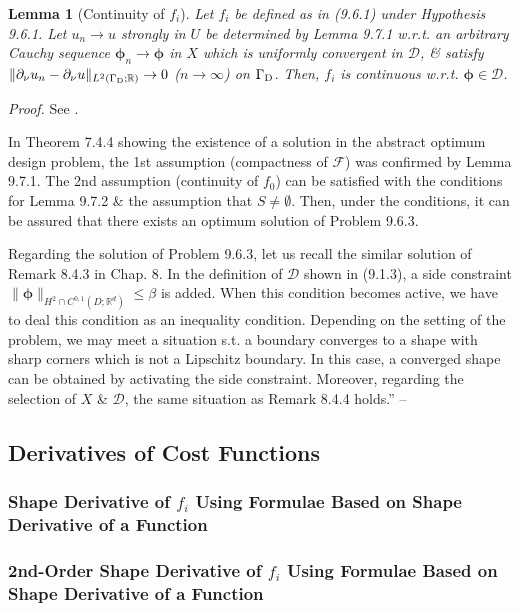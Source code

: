 \documentclass[oneside]{book}
\numberwithin{equation}{section}
\newtheorem{lemma}{Lemma}[chapter]
\begin{document}
\begin{lemma}[Continuity of $f_i$]
	Let $f_i$ be defined as in (9.6.1) under Hypothesis 9.6.1. Let $u_n\to u$ strongly in $U$ be determined by Lemma 9.7.1 w.r.t. an arbitrary Cauchy sequence $\boldsymbol{\phi}_n\to\boldsymbol{\phi}$ in $X$ which is uniformly convergent in $\mathcal{D}$, \& satisfy $\|\partial_\nu u_n - \partial_\nu u\|_{L^2(\Gamma_{\rm D};\mathbb{R})}\to 0$ ($n\to\infty$) on $\Gamma_{\rm D}$. Then, $f_i$ is continuous w.r.t. $\boldsymbol{\phi}\in\mathcal{D}$.
\end{lemma}
\textit{Proof.} See \cite[pp. 474--476]{Azegami2020}.

In Theorem 7.4.4 showing the existence of a solution in the abstract optimum design problem, the 1st assumption (compactness of $\mathcal{F}$) was confirmed by Lemma 9.7.1. The 2nd assumption (continuity of $f_0$) can be satisfied with the conditions for Lemma 9.7.2 \& the assumption that $S\ne\emptyset$. Then, under the conditions, it can be assured that there exists an optimum solution of Problem 9.6.3.

Regarding the solution of Problem 9.6.3, let us recall the similar solution of Remark 8.4.3 in Chap. 8. In the definition of $\mathcal{D}$ shown in (9.1.3), a side constraint $\|\boldsymbol{\phi}\|_{H^2\cap C^{0,1}(D;\mathbb{R}^d)}\le\beta$ is added. When this condition becomes active, we have to deal this condition as an inequality condition. Depending on the setting of the problem, we may meet a situation s.t. a boundary converges to a shape with sharp corners which is not a Lipschitz boundary. In this case, a converged shape can be obtained by activating the side constraint. Moreover, regarding the selection of $X$ \& $\mathcal{D}$, the same situation as Remark 8.4.4 holds.'' -- \cite[pp. 470--477]{Azegami2020}

\subsection{Derivatives of Cost Functions}

\subsubsection{Shape Derivative of $f_i$ Using Formulae Based on Shape Derivative of a Function}

\subsubsection{2nd-Order Shape Derivative of $f_i$ Using Formulae Based on Shape Derivative of a Function}
\end{document}
